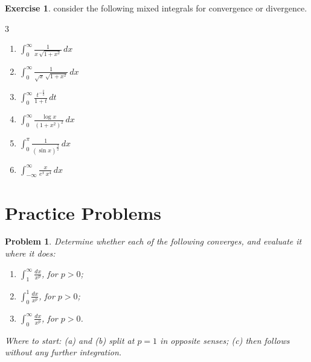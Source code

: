 \documentclass[12pt,a4paper]{report}
\theoremstyle{definition}
\newtheorem{exe}[thm]{Exercise}
\theoremstyle{plain}
\newtheorem{problemx}{Problem}[section]
\newenvironment{problem}{\begin{problemx}}{\end{problemx}}
\begin{document}
\begin{exe}
consider the following mixed integrals for convergence or divergence.
\begin{multicols}{3}
\begin{enumerate}
\item[(a).] $\displaystyle{\int_0^{\infty} \frac{1}{x\, \sqrt{1 + x^2}}\, dx}$
\item[(b).] $\displaystyle{\int_0^{\infty} \frac{1}{\sqrt{x}\, \sqrt{1 + x^2}}\, dx}$
\item[(c).] $\displaystyle{\int_0^{\infty} \frac{t^{-\frac{2}{3}}}{1 + t}\, dt}$
\item[(d).] $\displaystyle{\int^{\infty}_0\frac{\log x}{(1 + x^2)^2}}\, dx$
\item[(e).] $\displaystyle{\int_0^{\pi} \frac{1}{(\sin x)^{\frac{3}{2}}}\, dx}$
\item[(f).] $\displaystyle{\int_{-\infty}^{\infty} \frac{x}{e^x\, x^4}\, dx}$
\end{enumerate}
\end{multicols}
\end{exe}































\section{Practice Problems}

\begin{problem}
Determine whether each of the following converges, and evaluate it where it
does:
\begin{enumerate}
\item[(a)] $\displaystyle\int^{\infty}_{1}\frac{dx}{x^{p}}$, for $p>0$;
\item[(b)] $\displaystyle\int^{1}_{0}\frac{dx}{x^{p}}$, for $p>0$;
\item[(c)] $\displaystyle\int^{\infty}_{0}\frac{dx}{x^{p}}$, for $p>0$.
\end{enumerate}
\emph{Where to start: (a) and (b) split at $p=1$ in opposite senses; (c) then
follows without any further integration.}
\end{problem}
\end{document}
